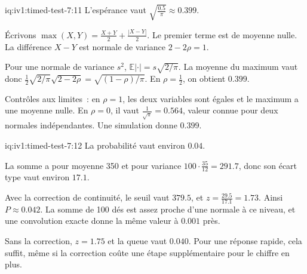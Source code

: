 \begin{solution}{iq:iv1:timed-test-7:11}
L'espérance vaut $\sqrt{\frac{0.5}{\pi}} \approx 0.399$.

Écrivons $\max(X, Y) = \frac{X + Y}{2} + \frac{|X - Y|}{2}$. Le premier terme est de moyenne nulle. La différence $X - Y$ est normale de variance $2 - 2\rho = 1$.

Pour une normale de variance $s^2$, $\mathbb{E}|\cdot| = s\sqrt{2/\pi}$. La moyenne du maximum vaut donc $\frac12\sqrt{2/\pi}\sqrt{2 - 2\rho} = \sqrt{(1 - \rho)/\pi}$. En $\rho = \frac12$, on obtient $0.399$.

Contrôles aux limites~: en $\rho = 1$, les deux variables sont égales et le maximum a une moyenne nulle. En $\rho = 0$, il vaut $\frac{1}{\sqrt\pi} = 0.564$, valeur connue pour deux normales indépendantes. Une simulation donne $0.399$.

\end{solution}

\begin{solution}{iq:iv1:timed-test-7:12}
La probabilité vaut environ $0.04$.

La somme a pour moyenne 350 et pour variance $100 \cdot \frac{35}{12} = 291.7$, donc son écart type vaut environ $17.1$.

Avec la correction de continuité, le seuil vaut $379.5$, et $z = \frac{29.5}{17.1} = 1.73$. Ainsi $P \approx 0.042$. La somme de 100 dés est assez proche d'une normale à ce niveau, et une convolution exacte donne la même valeur à $0.001$ près.

Sans la correction, $z = 1.75$ et la queue vaut $0.040$. Pour une réponse rapide, cela suffit, même si la correction coûte une étape supplémentaire pour le chiffre en plus.

\end{solution}
